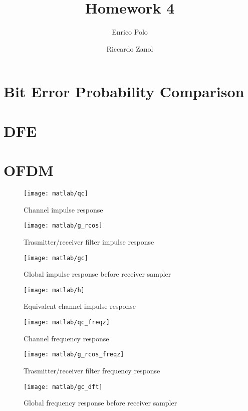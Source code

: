 \documentclass[a4paper,oneside]{article}
\author{Enrico Polo \and Riccardo Zanol}
\title{Homework 4}
\begin{document}
\maketitle

\section{Bit Error Probability Comparison}


\section{DFE}


\section{OFDM}
\begin{figure}[htbp]
  \centering
  \texttt{[image: matlab/qc]}
  \caption{Channel impulse response}
  \label{plot:qc}
\end{figure}

\begin{figure}[htbp]
  \centering
  \texttt{[image: matlab/g\_rcos]}
  \caption{Trasmitter/receiver filter impulse response}
  \label{plot:g_rcos}
\end{figure}

\begin{figure}[htbp]
  \centering
  \texttt{[image: matlab/gc]}
  \caption{Global impulse response before receiver sampler}
  \label{plot:gc}
\end{figure}

\begin{figure}[htbp]
  \centering
  \texttt{[image: matlab/h]}
  \caption{Equivalent channel impulse response}
  \label{plot:h}
\end{figure}


\begin{figure}[htbp]
  \centering
  \texttt{[image: matlab/qc\_freqz]}
  \caption{Channel frequency response}
  \label{plot:qc_freqz}
\end{figure}

\begin{figure}[htbp]
  \centering
  \texttt{[image: matlab/g\_rcos\_freqz]}
  \caption{Trasmitter/receiver filter frequency response}
  \label{plot:g_rcos_freqz}
\end{figure}

\begin{figure}[htbp]
  \centering
  \texttt{[image: matlab/gc\_dft]}
  \caption{Global frequency response before receiver sampler}
  \label{plot:gc_dft}
\end{figure}
\end{document}
